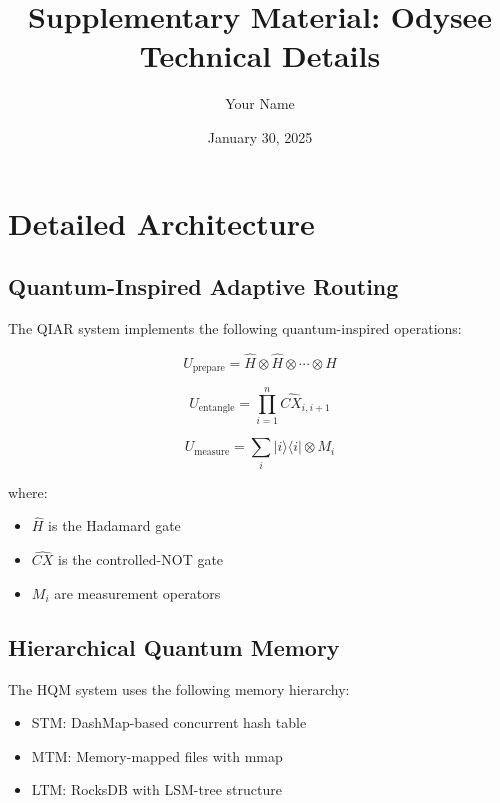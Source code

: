 \documentclass[10pt]{article}
\title{Supplementary Material: Odysee Technical Details}
\author{Your Name}
\date{January 30, 2025}
\begin{document}
\maketitle

\section{Detailed Architecture}

\subsection{Quantum-Inspired Adaptive Routing}

The QIAR system implements the following quantum-inspired operations:

\begin{equation}
    U_{\text{prepare}} = \hat{H} \otimes \hat{H} \otimes \cdots \otimes \hat{H}
\end{equation}

\begin{equation}
    U_{\text{entangle}} = \prod_{i=1}^n \hat{CX}_{i,i+1}
\end{equation}

\begin{equation}
    U_{\text{measure}} = \sum_i |i\rangle\langle i| \otimes M_i
\end{equation}

where:
\begin{itemize}
    \item $\hat{H}$ is the Hadamard gate
    \item $\hat{CX}$ is the controlled-NOT gate
    \item $M_i$ are measurement operators
\end{itemize}

\subsection{Hierarchical Quantum Memory}

The HQM system uses the following memory hierarchy:

\begin{itemize}
    \item STM: DashMap-based concurrent hash table
    \item MTM: Memory-mapped files with mmap
    \item LTM: RocksDB with LSM-tree structure
\end{itemize}
\end{document}
